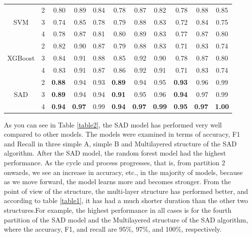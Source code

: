 \documentclass[12pt]{article}
\begin{document}
\begin{table}[H]
\begin{tabular}{lrrrrrrrrrr}
            \hline
            \multicolumn{1}{c}{\multirow{3}{*}{SVM}} & \multicolumn{1}{c}{2} & 0.80 & 0.89 & \multicolumn{1}{c}{0.84} & 0.78 & 0.87 & \multicolumn{1}{c}{0.82} & 0.78 & 0.88 & \multicolumn{1}{c}{0.85}  \\
            \multicolumn{1}{c}{} & \multicolumn{1}{c}{3} & 0.74 & 0.85 & \multicolumn{1}{c}{0.78} & 0.79 & 0.88 & \multicolumn{1}{c}{0.83} & 0.72 & 0.84 & \multicolumn{1}{c}{0.75}  \\
            \multicolumn{1}{c}{} & \multicolumn{1}{c}{4} & 0.78 & 0.87 & \multicolumn{1}{c}{0.81} & 0.80 & 0.89 & \multicolumn{1}{c}{0.83} & 0.77 & 0.87 & \multicolumn{1}{c}{0.80}   \\
            \hline
            \multicolumn{1}{c}{\multirow{3}{*}{XGBoost}} & \multicolumn{1}{c}{2} & 0.82 & 0.90 & \multicolumn{1}{c}{0.87} & 0.79 & 0.88 & \multicolumn{1}{c}{0.83} & 0.71 & 0.83 & \multicolumn{1}{c}{0.74}  \\
            \multicolumn{1}{c}{} & \multicolumn{1}{c}{3} & 0.84 & 0.91 & \multicolumn{1}{c}{0.88} & 0.85 & 0.92 & \multicolumn{1}{c}{0.90} & 0.78 & 0.87 & \multicolumn{1}{c}{0.80}  \\
            \multicolumn{1}{c}{} & \multicolumn{1}{c}{4} & 0.83 & 0.91 & \multicolumn{1}{c}{0.87} & 0.86 & 0.92 & \multicolumn{1}{c}{0.91} & 0.71 & 0.83 & \multicolumn{1}{c}{0.74}  \\
            \hline
            \multicolumn{1}{c}{\multirow{3}{*}{SAD}} & \multicolumn{1}{c}{2} & \textbf{0.88} & 0.94 & \multicolumn{1}{c}{0.93} & \textbf{0.89} & 0.94 & \multicolumn{1}{c}{0.95} & \textbf{0.93} & 0.96 & \multicolumn{1}{c}{0.99}  \\
            \multicolumn{1}{c}{} & \multicolumn{1}{c}{3} & \textbf{0.89} & 0.94 & \multicolumn{1}{c}{0.94} & \textbf{0.91} & 0.95 & \multicolumn{1}{c}{0.96} & \textbf{0.94} & 0.97 & \multicolumn{1}{c}{0.99}  \\
            \multicolumn{1}{c}{} & \multicolumn{1}{c}{4} & \textbf{0.94} & \textbf{0.97} & \multicolumn{1}{c}{0.99} & \textbf{0.94} & \textbf{0.97} & \multicolumn{1}{c}{\textbf{0.99}} & \textbf{0.95} & \textbf{0.97} & \multicolumn{1}{c}{\textbf{1.00}}  \\
            \hline
        \end{tabular}
    \end{table}
    As you can see in Table \ref{table2}, the SAD model has performed very well compared to other models. The models were examined in terms of accuracy, F1 and Recall in three simple A, simple B and Multilayered structure of the SAD algorithm. After the SAD model, the random forest model had the highest performance. As the cycle and process progresses, that is, from partition 2 onwards, we see an increase in accuracy, etc., in the majority of models, because as we move forward, the model learns more and becomes stronger. From the point of view of the structure, the multi-layer structure has performed better, and according to table \ref{table1}, it has had a much shorter duration than the other two structures.For example, the highest performance in all cases is for the fourth partition of the SAD model and the Multilayered structure of the SAD algorithm, where the accuracy, F1, and recall are 95\%, 97\%, and 100\%, respectively.
\end{document}
